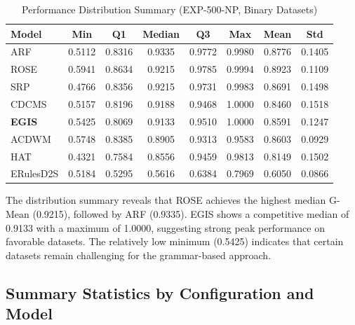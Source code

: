 \documentclass[lettersize,10pt]{article}
\begin{document}
\begin{table}[htbp]
\centering
\caption{Performance Distribution Summary (EXP-500-NP, Binary Datasets)}
\label{tab:s_perf_dist}
\footnotesize
\begin{tabular}{lccccccc}
\toprule
\textbf{Model} & \textbf{Min} & \textbf{Q1} & \textbf{Median} & \textbf{Q3} & \textbf{Max} & \textbf{Mean} & \textbf{Std} \\
\midrule
ARF & 0.5112 & 0.8316 & 0.9335 & 0.9772 & 0.9980 & 0.8776 & 0.1405 \\
ROSE & 0.5941 & 0.8634 & 0.9215 & 0.9785 & 0.9994 & 0.8923 & 0.1109 \\
SRP & 0.4766 & 0.8356 & 0.9215 & 0.9731 & 0.9983 & 0.8691 & 0.1498 \\
CDCMS & 0.5157 & 0.8196 & 0.9188 & 0.9468 & 1.0000 & 0.8460 & 0.1518 \\
\textbf{EGIS} & 0.5425 & 0.8069 & 0.9133 & 0.9510 & 1.0000 & 0.8591 & 0.1247 \\
ACDWM & 0.5748 & 0.8385 & 0.8905 & 0.9313 & 0.9583 & 0.8603 & 0.0929 \\
HAT & 0.4321 & 0.7584 & 0.8556 & 0.9459 & 0.9813 & 0.8149 & 0.1502 \\
ERulesD2S & 0.5184 & 0.5295 & 0.5616 & 0.6384 & 0.7969 & 0.6050 & 0.0866 \\
\bottomrule
\end{tabular}
\end{table}

The distribution summary reveals that ROSE achieves the highest median G-Mean (0.9215), followed by ARF (0.9335). EGIS shows a competitive median of 0.9133 with a maximum of 1.0000, suggesting strong peak performance on favorable datasets. The relatively low minimum (0.5425) indicates that certain datasets remain challenging for the grammar-based approach.

\subsection{Summary Statistics by Configuration and Model}
\label{sec:s2_summary}
\end{document}

